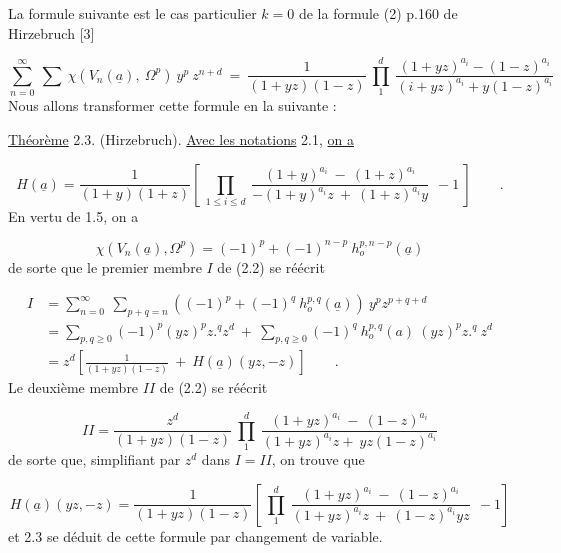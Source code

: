 La formule suivante est le cas particulier $k = 0$ de la formule (2) p.160 de Hirzebruch [3] 



\begin{equation}\tag{2.2}
\sum_{n=0}^{\infty}\ \sum\ \chi(V_n(\underline{a}),\ \Omega^p)\ y^p\ z^{n+d}\ =\ \frac{1}{(1+yz)(1-z)}\ \prod_{1}^{d}\ \frac{(1+yz)^{a_i}-(1-z)^{a_i}}{(i+yz)^{a_i}+y(1-z)^{a_i}}
\end{equation}
Nous allons transformer cette formule en la suivante :

\underline{Théorème} 2.3. (Hirzebruch). \underline{Avec les notations} 2.1, \underline{on a}

\begin{equation*}
H(\underline{a}) = \frac{1}{(1+y)(1+z)}\left[\ \prod_{1\leq i\leq d}\ \frac{(1+y)^{a_i}\ -\ (1+z)^{a_i}}{-(1+y)^{a_i}z\ +\ (1+z)^{a_i}y}\ \ -1\ \right] \qquad .
\end{equation*}
En vertu de 1.5, on a

\begin{equation*}
\chi(V_n(\underline{a}),\Omega^p) = (-1)^p + (-1)^{n-p}\ h_o^{p,n-p}(\underline{a})
\end{equation*}
de sorte que le premier membre $I$ de (2.2) se réécrit

\begin{equation*}
\begin{aligned}
I &= \sum_{n=0}^{\infty}\ \sum_{p+q=n} ((-1)^p+(-1)^q\ h_o^{p,q}(\underline{a}))\ y^p z^{p+q+d}\\
&= \sum_{p,q\geq 0} (-1)^p(yz)^p z.^q z^d\ +\ \sum_{p,q\geq 0} (-1)^q\ h_o^{p,q}(a)\ (yz)^p z.^q\ z^d\\
&= z^d\left[\frac{1}{(1+yz)(1-z)}\ +\ H(\underline{a})(yz,-z)\right] \qquad .
\end{aligned}
\end{equation*}
Le deuxième membre $II$ de (2.2) se réécrit

\begin{equation*}
II = \frac{z^d}{(1+yz)(1-z)}\ \prod_{1}^{d}\ \frac{(1+yz)^{a_i}\ -\ (1-z)^{a_i}}{(1+yz)^{a_i}z+\ yz(1-z)^{a_i}}
\end{equation*}
de sorte que, simplifiant par $z^d$ dans $I = II$, on trouve que

\begin{equation*}
H(\underline{a})(yz,-z) = \frac{1}{(1+yz)(1-z)}\left[\ \prod_{1}^{d}\ \frac{(1+yz)^{a_i}\ -\ (1-z)^{a_i}}{(1+yz)^{a_i}z\ +\ (1-z)^{a_i}yz}\ \ -1\right]
\end{equation*}
et 2.3 se déduit de cette formule par changement de variable.


